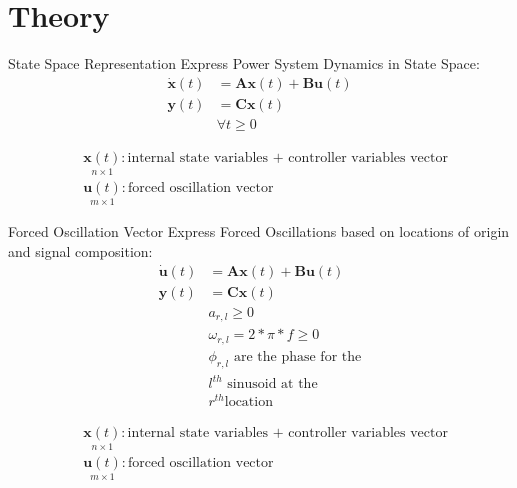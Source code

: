 \section[Theory]{Theory}
\label{sec:lasso_theory}

\begin{frame}[fragile]{State Space Representation}
	Express Power System Dynamics in State Space:
	\begin{equation}
		\label{eq:ssr}
		\begin{align*}
			\dot{\textbf{x}}(t) &= 
			\textbf{A}\textbf{x}(t)
			+ \textbf{B}\textbf{u}(t)\\
			\textbf{y}(t) &= 
			\textbf{C}\textbf{x}(t)\\  
			& \forall t\geq0	
		\end{align*}
	\end{equation}
	
	\begin{align*}
		& \underset{\scriptscriptstyle n\times 1}{\textbf{x}(t)} : \text{internal state variables + controller variables vector}                                                                      \\
		& \underset{\scriptscriptstyle m\times 1}{\textbf{u}(t)} : \text{forced oscillation vector}
	\end{align*}
\end{frame}

\begin{frame}[fragile]{Forced Oscillation Vector}
	Express Forced Oscillations based on locations of origin and signal composition:
	\begin{equation}
		\label{eq:u1}
		\begin{align*}
			\dot{\textbf{u}}(t) &= 
			\textbf{A}\textbf{x}(t)
			+ \textbf{B}\textbf{u}(t)\\
			\textbf{y}(t) &= 
			\textbf{C}\textbf{x}(t)\\  
			& a_{r,l} \geq0 \\
			& \omega_{r,l} = 2*\pi*f \geq 0 \\
			& \phi_{r,l} \text{ are the phase for the} \\
			& l^{th} \text{ sinusoid at the} \\
			& r^{th} \text{location}
				
		\end{align*}
	\end{equation}
	
	\begin{align*}
		& \underset{\scriptscriptstyle n\times 1}{\textbf{x}(t)} : \text{internal state variables + controller variables vector}                                                                      \\
		& \underset{\scriptscriptstyle m\times 1}{\textbf{u}(t)} : \text{forced oscillation vector}
	\end{align*}
\end{frame}
